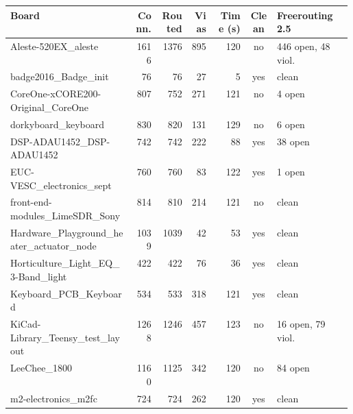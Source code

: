 \begin{longtable}{@{}p{0.36\linewidth}rrrrcp{0.22\linewidth}@{}}
\toprule Board & Conn. & Routed & Vias & Time (s) & Clean & Freerouting 2.5 \\ \midrule \endhead
Aleste-\allowbreak{}520EX\_\allowbreak{}aleste & 1616 & 1376 & 895 & 120 & \textcolor{frorange}{no} & {\footnotesize 446 open, 48 viol.} \\
badge2016\_\allowbreak{}Badge\_\allowbreak{}init & 76 & 76 & 27 & 5 & \textcolor{fraqua}{yes} & {\footnotesize clean} \\
CoreOne-\allowbreak{}xCORE200-\allowbreak{}Original\_\allowbreak{}CoreOne & 807 & 752 & 271 & 121 & \textcolor{frorange}{no} & {\footnotesize 4 open} \\
dorkyboard\_\allowbreak{}keyboard & 830 & 820 & 131 & 129 & \textcolor{frorange}{no} & {\footnotesize 6 open} \\
DSP-\allowbreak{}ADAU1452\_\allowbreak{}DSP-\allowbreak{}ADAU1452 & 742 & 742 & 222 & 88 & \textcolor{fraqua}{yes} & {\footnotesize 38 open} \\
EUC-\allowbreak{}VESC\_\allowbreak{}electronics\_\allowbreak{}sept & 760 & 760 & 83 & 122 & \textcolor{fraqua}{yes} & {\footnotesize 1 open} \\
front-\allowbreak{}end-\allowbreak{}modules\_\allowbreak{}LimeSDR\_\allowbreak{}Sony & 814 & 810 & 214 & 121 & \textcolor{frorange}{no} & {\footnotesize clean} \\
Hardware\_\allowbreak{}Playground\_\allowbreak{}heater\_\allowbreak{}actuator\_\allowbreak{}node & 1039 & 1039 & 42 & 53 & \textcolor{fraqua}{yes} & {\footnotesize clean} \\
Horticulture\_\allowbreak{}Light\_\allowbreak{}EQ\_\allowbreak{}3-\allowbreak{}Band\_\allowbreak{}light & 422 & 422 & 76 & 36 & \textcolor{fraqua}{yes} & {\footnotesize clean} \\
Keyboard\_\allowbreak{}PCB\_\allowbreak{}Keyboard & 534 & 533 & 318 & 121 & \textcolor{fraqua}{yes} & {\footnotesize clean} \\
KiCad-\allowbreak{}Library\_\allowbreak{}Teensy\_\allowbreak{}test\_\allowbreak{}layout & 1268 & 1246 & 457 & 123 & \textcolor{frorange}{no} & {\footnotesize 16 open, 79 viol.} \\
LeeChee\_\allowbreak{}1800 & 1160 & 1125 & 342 & 120 & \textcolor{frorange}{no} & {\footnotesize 84 open} \\
m2-\allowbreak{}electronics\_\allowbreak{}m2fc & 724 & 724 & 262 & 120 & \textcolor{fraqua}{yes} & {\footnotesize clean} \\

\end{longtable}
